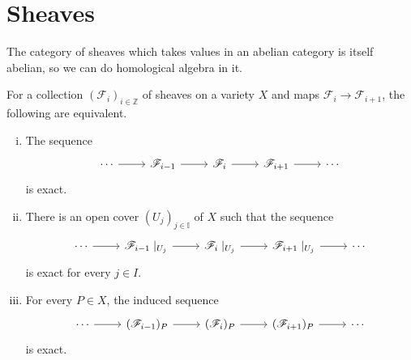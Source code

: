 \section{Sheaves}
The category of sheaves which takes values in an abelian category is
itself abelian, so we can do homological algebra in it.

\begin{thm}\label{thm:ses_equivalence}
  For a collection $(\mathscr{F}_{i})_{i\in\mathbb{Z}}$ of sheaves on
  a variety $X$ and maps ${\mathscr{F}_{i}\to\mathscr{F}_{i+1}}$,
  the following are equivalent.
  \begin{enumerate}[(i)]
    \item The sequence
          \[
          \begin{tikzcd}
            \cdots \rar & \mathscr{F}_{i-1}\rar
            & \mathscr{F}_{i}\rar & \mathscr{F}_{i+1}\rar & \cdots
          \end{tikzcd}
          \]
          is exact.
    \item There is an open cover $(U_{j})_{j\in\mathbb{I}}$ of $X$ such that
          the sequence
          \[
          \begin{tikzcd}
            \cdots \rar & \mathscr{F}_{i-1}\mid_{U_{j}}\rar
            & \mathscr{F}_{i}\mid_{U_{j}}\rar
            & \mathscr{F}_{i+1}\mid_{U_{j}}\rar & \cdots
          \end{tikzcd}
          \]
          is exact for every $j\in I$.
    \item For every $P\in X$, the induced sequence
          \[
          \begin{tikzcd}
            \cdots \rar & (\mathscr{F}_{i-1})_{P}\rar
            & (\mathscr{F}_{i})_{P}\rar
            & (\mathscr{F}_{i+1})_{P}\rar & \cdots
          \end{tikzcd}
          \]
          is exact.
  \end{enumerate}
\end{thm}
